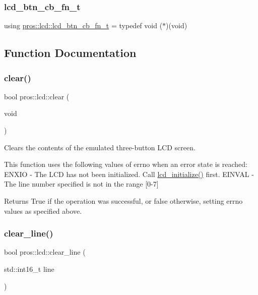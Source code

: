 \subsubsection{\texorpdfstring{lcd\+\_\+btn\+\_\+cb\+\_\+fn\+\_\+t}{lcd\_btn\_cb\_fn\_t}}
{\footnotesize\ttfamily using \hyperlink{namespacepros_1_1lcd_ab5c0cdcf37795ff2a9dcaf546b087dd4}{pros\+::lcd\+::lcd\+\_\+btn\+\_\+cb\+\_\+fn\+\_\+t} = typedef void ($\ast$)(void)}



\subsection{Function Documentation}
\mbox{\label{namespacepros_1_1lcd_a8d22379bd680a36182d51d8e8ef02baf}} 
\subsubsection{\texorpdfstring{clear()}{clear()}}
{\footnotesize\ttfamily bool pros\+::lcd\+::clear (\begin{DoxyParamCaption}\item[{void}]{ }\end{DoxyParamCaption})}



Clears the contents of the emulated three-\/button L\+CD screen. 

This function uses the following values of errno when an error state is reached\+: E\+N\+X\+IO -\/ The L\+CD has not been initialized. Call \hyperlink{llemu_8h_ae618494f080e95b506c0c18cb1ffb407}{lcd\+\_\+initialize()} first. E\+I\+N\+V\+AL -\/ The line number specified is not in the range \mbox{[}0-\/7\mbox{]}

\begin{DoxyReturn}{Returns}
True if the operation was successful, or false otherwise, setting errno values as specified above. 
\end{DoxyReturn}
\mbox{\label{namespacepros_1_1lcd_aef44947cea9006f86d4aaa2e32856835}} 
\subsubsection{\texorpdfstring{clear\+\_\+line()}{clear\_line()}}
{\footnotesize\ttfamily bool pros\+::lcd\+::clear\+\_\+line (\begin{DoxyParamCaption}\item[{std\+::int16\+\_\+t}]{line }\end{DoxyParamCaption})}



